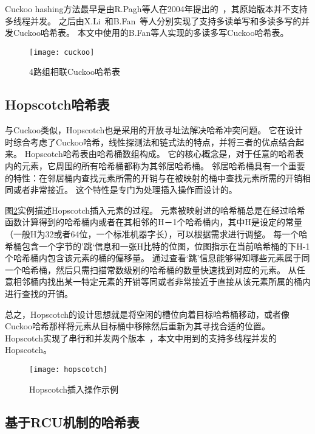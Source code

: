 Cuckoo hashing方法最早是由R.Pagh等人在2004年提出的~\cite{cuckoo-src}，其原始版本并不支持多线程并发。
之后由X.Li~\cite{memc3}和B.Fan~\cite{cuckoo}等人分别实现了支持多读单写和多读多写的并发Cuckoo哈希表。
本文中使用的B.Fan等人实现的多读多写Cuckoo哈希表。

\begin{figure}[htbp]
\centering
\texttt{[image: cuckoo]}
\caption{4路组相联Cuckoo哈希表}\label{fig:cuckoo}
\end{figure}

\subsection{Hopscotch哈希表}
与Cuckoo类似，Hopscotch也是采用的开放寻址法解决哈希冲突问题。
它在设计时综合考虑了Cuckoo哈希，线性探测法和链式法的特点，并将三者的优点结合起来。
Hopscotch哈希表由哈希桶数组构成。
它的核心概念是，对于任意的哈希表内的元素，它周围的所有哈希桶都称为其邻居哈希桶。
邻居哈希桶具有一个重要的特性：在邻居桶内查找元素所需的开销与在被映射的桶中查找元素所需的开销相同或者非常接近。
这个特性是专门为处理插入操作而设计的。

图\ref{fig:hopscotch}实例描述Hopscotch插入元素的过程。
元素被映射进的哈希桶总是在经过哈希函数计算得到的哈希桶内或者在其相邻的H－1个哈希桶内，其中H是设定的常量（一般H为32或者64位，一个标准机器字长），可以根据需求进行调整。
每一个哈希桶包含一个字节的’跳‘信息和一张H比特的位图，位图指示在当前哈希桶的下H-1个哈希桶内包含该元素的桶的偏移量。
通过查看‘跳’信息能够得知哪些元素属于同一个哈希桶，然后只需扫描常数级别的哈希桶的数量快速找到对应的元素。
从任意相邻桶内找出某一特定元素的开销等同或者非常接近于直接从该元素所属的桶内进行查找的开销。


总之，Hopscotch的设计思想就是将空闲的槽位向着目标哈希桶移动，或者像Cuckoo哈希那样将元素从目标桶中移除然后重新为其寻找合适的位置。
Hopscotch实现了串行和并发两个版本~\cite{hopscotch}，本文中用到的支持多线程并发的Hopscotch。

\begin{figure}[htbp]
\centering
\texttt{[image: hopscotch]}
\caption{Hopscotch插入操作示例}
\label{fig:hopscotch}
\end{figure}

\subsection{基于RCU机制的哈希表}


